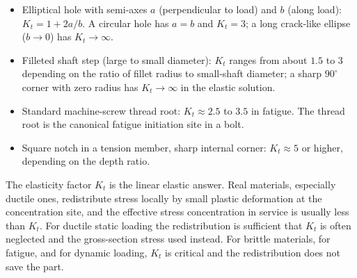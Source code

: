 \begin{itemize}[leftmargin=*]
  \item Elliptical hole with semi-axes $a$ (perpendicular to load)
    and $b$ (along load): $K_t = 1 + 2 a / b$. A circular hole has
    $a = b$ and $K_t = 3$; a long crack-like ellipse ($b \to 0$) has
    $K_t \to \infty$.
  \item Filleted shaft step (large to small diameter): $K_t$ ranges
    from about $1.5$ to $3$ depending on the ratio of fillet radius
    to small-shaft diameter; a sharp $90^{\circ}$ corner with zero
    radius has $K_t \to \infty$ in the elastic solution.
  \item Standard machine-screw thread root: $K_t \approx 2.5$ to
    $3.5$ in fatigue. The thread root is the canonical fatigue
    initiation site in a bolt.
  \item Square notch in a tension member, sharp internal corner:
    $K_t \approx 5$ or higher, depending on the depth ratio.
\end{itemize}

The elasticity factor $K_t$ is the linear elastic answer. Real
materials, especially ductile ones, redistribute stress locally by
small plastic deformation at the concentration site, and the
effective stress concentration in service is usually less than
$K_t$. For ductile static loading the redistribution is sufficient
that $K_t$ is often neglected and the gross-section stress used
instead. For brittle materials, for fatigue, and for dynamic
loading, $K_t$ is critical and the redistribution does not save
the part.

